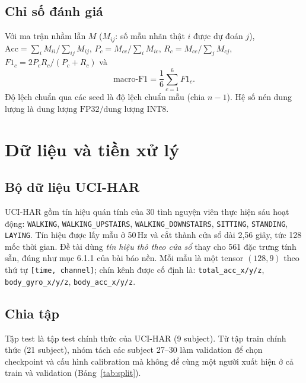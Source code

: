\documentclass[12pt,a4paper]{article}
\newcommand{\code}[1]{\texttt{#1}}
\begin{document}
\subsection{Chỉ số đánh giá}
Với ma trận nhầm lẫn $M$ ($M_{ij}$: số mẫu nhãn thật $i$ được dự đoán $j$), $\mathrm{Acc}=\sum_i M_{ii}/\sum_{ij}M_{ij}$, $P_c=M_{cc}/\sum_i M_{ic}$, $R_c=M_{cc}/\sum_j M_{cj}$, $F1_c=2P_cR_c/(P_c+R_c)$ và
\begin{equation}
\text{macro-F1}=\frac{1}{6}\sum_{c=1}^{6}F1_c .
\end{equation}
Độ lệch chuẩn qua các seed là độ lệch chuẩn mẫu (chia $n-1$). Hệ số nén dung lượng là $\text{dung lượng FP32}/\text{dung lượng INT8}$.

\section{Dữ liệu và tiền xử lý}

\subsection{Bộ dữ liệu UCI-HAR}
UCI-HAR \cite{anguita2013} gồm tín hiệu quán tính của 30 tình nguyện viên thực hiện sáu hoạt động: \code{WALKING}, \code{WALKING\_UPSTAIRS}, \code{WALKING\_DOWNSTAIRS}, \code{SITTING}, \code{STANDING}, \code{LAYING}. Tín hiệu được lấy mẫu ở 50\,Hz và cắt thành cửa sổ dài 2,56 giây, tức 128 mốc thời gian. Đề tài dùng \emph{tín hiệu thô theo cửa sổ} thay cho 561 đặc trưng tính sẵn, đúng như mục 6.1.1 của bài báo nền. Mỗi mẫu là một tensor $(128,9)$ theo thứ tự \code{[time, channel]}; chín kênh được cố định là: \code{total\_acc\_x/y/z}, \code{body\_gyro\_x/y/z}, \code{body\_acc\_x/y/z}.

\subsection{Chia tập}
Tập test là tập test chính thức của UCI-HAR (9 subject). Từ tập train chính thức (21 subject), nhóm tách các subject 27--30 làm validation để chọn checkpoint và cấu hình calibration mà không để cùng một người xuất hiện ở cả train và validation (Bảng~\ref{tab:split}).

\begin{table}[t]
\centering\small

\caption{Chia dữ liệu theo subject (nguồn: \code{data/processed/split.json}).}
\label{tab:split}
\end{table}
\end{document}
